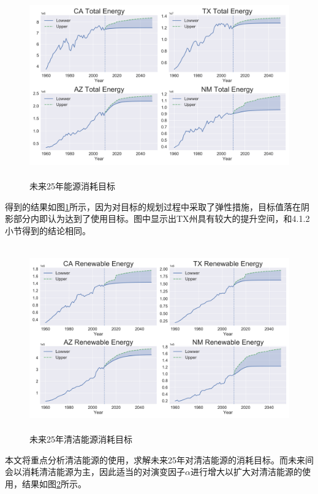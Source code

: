 \documentclass[13pt]{ctexart}
\begin{document}
\begin {figure}[h]
	\centering %
	\includegraphics[width=14cm,height=8cm]{6.png}
	\caption{未来25年能源消耗目标} %
	\label{pic6}
\end {figure}

得到的结果如图\ref{pic6}所示，因为对目标的规划过程中采取了弹性措施，目标值落在阴影部分内即认为达到了使用目标。图中显示出TX州具有较大的提升空间，和4.1.2小节得到的结论相同。
\begin {figure}[h]
	\centering %
	\includegraphics[width=14cm,height=8cm]{7.png}
	\caption{未来25年清洁能源消耗目标} %
	\label{pic7}
\end {figure}

本文将重点分析清洁能源的使用，求解未来25年对清洁能源的消耗目标。而未来间会以消耗清洁能源为主，因此适当的对演变因子$\alpha$进行增大以扩大对清洁能源的使用，结果如图\ref{pic7}所示。
\end{document}
